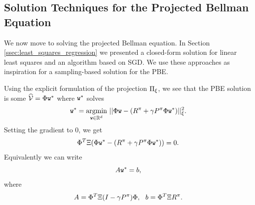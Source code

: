 \subsection{Solution Techniques for the Projected Bellman Equation}\label{ssec:TD_solution_techniques}
We now move to solving the projected Bellman equation. 
In Section \ref{ssec:least_squares_regression} we presented a closed-form solution for linear least squares and an algorithm based on SGD. We use these approaches as inspiration for a sampling-based solution for the PBE.

Using the explicit formulation of the projection $\Pi_\xi$, we see that the PBE solution is some $\widehat{\mathcal{V}} = \Phi {\tt w}^*$ where ${\tt w}^*$ solves
$${\tt w}^* = \underset{{{\tt w} \in \mathbb{R}^d}}{\operatorname{argmin}} \ ||\Phi {\tt w} - (R^\pi+\gamma P^\pi\Phi {\tt w}^*)||_\xi^2.$$
Setting the gradient to $0$, we get
$$\Phi^T \Xi (\Phi {\tt w}^* - (R^\pi+\gamma P^\pi \Phi {\tt w}^*)) = 0.$$
Equivalently we can write
$$A {\tt w}^* = b,$$
where
\begin{equation}\label{eq:A_b_TD}
A = \Phi^T \Xi(I-\gamma P^\pi) \Phi, \ \ b = \Phi^T\Xi R^\pi.
\end{equation}

